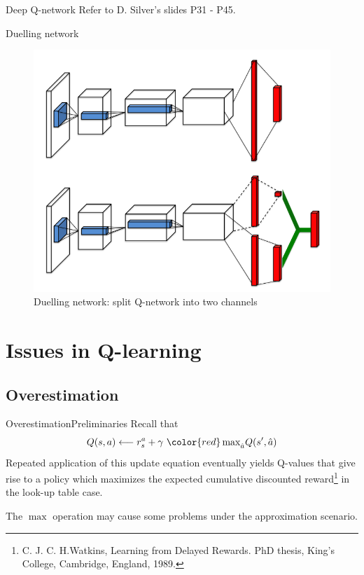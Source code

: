 \documentclass{beamer}
\newcommand{\red}[1]{{\color{red} #1}}
\newcommand{\blue}[1]{{\color{blue} #1}}
\newcommand{\ha}{\hat{a}}
\begin{document}
\begin{frame}{Deep Q-network}
Refer to D. Silver's slides P31 - P45.
\end{frame}

\begin{frame}{Duelling network}
\begin{figure}
\centering
\includegraphics[width=0.65\linewidth]{figures/duel-network}
\caption{Duelling network: split Q-network into two channels}
\label{fig:duel-network}
\end{figure}
\end{frame}




\section{Issues in Q-learning}

\subsection{Overestimation}
\begin{frame}{Overestimation}{Preliminaries}
	Recall that
	\begin{equation}
		Q(s,a) \longleftarrow r^a_s + \gamma~\red{\max}_{\ha} Q(s', \ha)
	\end{equation}
	Repeated application of this update equation eventually yields Q-values that give rise to \blue{a policy which maximizes the expected cumulative discounted reward}\footnote{C. J. C. H.Watkins, Learning from Delayed Rewards. PhD thesis, King’s College, Cambridge, England, 1989.} in the look-up table case.
	
	The \red{$\max$} operation may cause some problems under the approximation scenario.
\end{frame}
\end{document}
